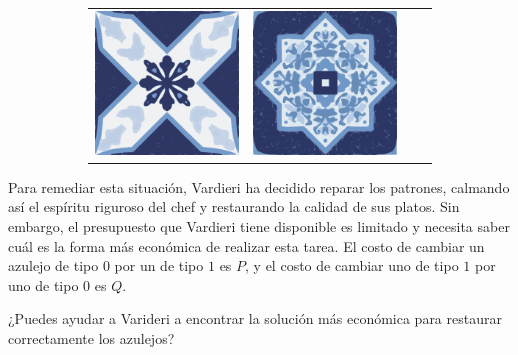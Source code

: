 \documentclass{oci}
\begin{document}
\begin{problemDescription}
\begin{figure}[h]
\begin{subfigure}{0.45\textwidth}
\begin{center}
{\begin{tabular}{cccc}
        \includegraphics[scale=0.3]{b.eps} &
        \includegraphics[scale=0.3]{a.eps}
      \end{tabular}
    }
  \end{center}
\end{subfigure}
\end{figure}

Para remediar esta situación, Vardieri ha decidido reparar los patrones, calmando
así el espíritu riguroso del chef y restaurando la calidad de sus platos.
Sin embargo, el presupuesto que Vardieri tiene disponible es limitado y necesita saber cuál es la forma más económica de realizar esta tarea.
El costo de cambiar un azulejo de tipo $0$ por un de tipo $1$ es $P$, y el costo
de cambiar uno de tipo $1$ por uno de tipo $0$ es $Q$.


¿Puedes ayudar a Varideri a encontrar la solución más económica para restaurar correctamente los azulejos?

\end{problemDescription}
\end{document}
